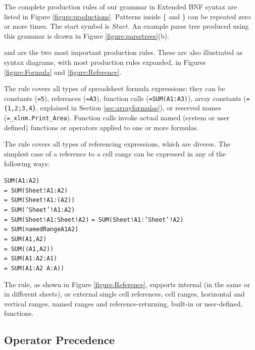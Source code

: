 \documentclass[conference]{IEEEtran}
\begin{document}
The complete production rules of our grammar in Extended BNF syntax are listed in Figure \ref{figure:productions}.
Patterns inside \{ and \} can be repeated zero or more times.
The start symbol is $Start$. An example parse tree produced using this grammar is drawn in Figure \ref{figure:parsetrees}(b).

 and  are the two most important production rules.
These are also illustrated as syntax diagrams, with most production rules expanded, in Figures \ref{figure:Formula} and \ref{figure:Reference}.

The  rule covers all types of spreadsheet formula expressions: they can be constants (\texttt{=5}), references (\texttt{=A3}), function calls (\texttt{=SUM(A1:A3)}), array constants (\texttt{=\{1,2;3,4\}}, explained in Section \ref{sec:arrayformulas}), or reserved names (\texttt{=_xlnm.Print_Area}). Function calls invoke actual named (system or user defined) functions or operators applied to one or more formulas.

The  rule covers all types of referencing expressions, which are diverse. The simplest case of a reference to a cell range can be expressed in any of the following ways:

\begin{multicols}{2}
	\texttt{SUM(A1:A2)} \\ 
	\texttt{= SUM(Sheet!A1:A2)} \\
	\texttt{= SUM(Sheet!A1:(A2))} \\
	\texttt{= SUM('Sheet'!A1:A2)} \\
	\texttt{= SUM(Sheet!A1:Sheet!A2)}
		\columnbreak
	\texttt{= SUM(Sheet!A1:'Sheet'!A2)} \\
	\texttt{= SUM(namedRangeA1A2)} \\ 
	\texttt{= SUM(A1,A2)} \\ 
	\texttt{= SUM((A1,A2))} \\ 
	\texttt{= SUM(A1:A2:A1)} \\
	\texttt{= SUM(A1:A2 A:A))} 
\end{multicols}

The  rule, as shown in Figure \ref{figure:Reference}, supports internal (in the same or in different sheets), or external single cell references, cell ranges, horizontal and vertical ranges, named ranges and reference-returning, built-in or user-defined, functions.

\subsection{Operator Precedence}
\label{sec:operatorprecedence}
\end{document}
